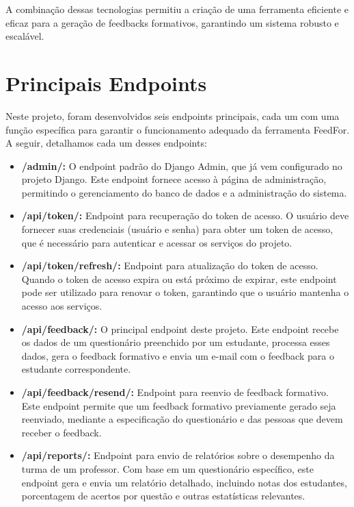 A combinação dessas tecnologias permitiu a criação de uma ferramenta eficiente e eficaz para a geração de feedbacks formativos, garantindo um sistema robusto e escalável.


\section{Principais Endpoints}

Neste projeto, foram desenvolvidos seis endpoints principais, cada um com uma função específica para garantir o funcionamento adequado da ferramenta FeedFor. A seguir, detalhamos cada um desses endpoints:

\begin{itemize}
    \item \textbf{/admin/:} O endpoint padrão do Django Admin, que já vem configurado no projeto Django. Este endpoint fornece acesso à página de administração, permitindo o gerenciamento do banco de dados e a administração do sistema.
    
    \item \textbf{/api/token/:} Endpoint para recuperação do token de acesso. O usuário deve fornecer suas credenciais (usuário e senha) para obter um token de acesso, que é necessário para autenticar e acessar os serviços do projeto.
    
    \item \textbf{/api/token/refresh/:} Endpoint para atualização do token de acesso. Quando o token de acesso expira ou está próximo de expirar, este endpoint pode ser utilizado para renovar o token, garantindo que o usuário mantenha o acesso aos serviços.
    
    \item \textbf{/api/feedback/:} O principal endpoint deste projeto. Este endpoint recebe os dados de um questionário preenchido por um estudante, processa esses dados, gera o feedback formativo e envia um e-mail com o feedback para o estudante correspondente.
    
    \item \textbf{/api/feedback/resend/:} Endpoint para reenvio de feedback formativo. Este endpoint permite que um feedback formativo previamente gerado seja reenviado, mediante a especificação do questionário e das pessoas que devem receber o feedback.
    
    \item \textbf{/api/reports/:} Endpoint para envio de relatórios sobre o desempenho da turma de um professor. Com base em um questionário específico, este endpoint gera e envia um relatório detalhado, incluindo notas dos estudantes, porcentagem de acertos por questão e outras estatísticas relevantes.
\end{itemize}

